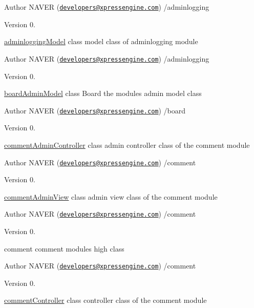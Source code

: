 \begin{DoxyAuthor}{Author}
N\+A\+V\+ER (\href{mailto:developers@xpressengine.com}{\tt developers@xpressengine.\+com}) /adminlogging 
\end{DoxyAuthor}
\begin{DoxyVersion}{Version}
0.
\end{DoxyVersion}
\hyperlink{classadminloggingModel}{adminlogging\+Model} class model class of adminlogging module

\begin{DoxyAuthor}{Author}
N\+A\+V\+ER (\href{mailto:developers@xpressengine.com}{\tt developers@xpressengine.\+com}) /adminlogging 
\end{DoxyAuthor}
\begin{DoxyVersion}{Version}
0.
\end{DoxyVersion}
\hyperlink{classboardAdminModel}{board\+Admin\+Model} class Board the module\textquotesingle{}s admin model class

\begin{DoxyAuthor}{Author}
N\+A\+V\+ER (\href{mailto:developers@xpressengine.com}{\tt developers@xpressengine.\+com}) /board 
\end{DoxyAuthor}
\begin{DoxyVersion}{Version}
0.
\end{DoxyVersion}
\hyperlink{classcommentAdminController}{comment\+Admin\+Controller} class admin controller class of the comment module

\begin{DoxyAuthor}{Author}
N\+A\+V\+ER (\href{mailto:developers@xpressengine.com}{\tt developers@xpressengine.\+com}) /comment 
\end{DoxyAuthor}
\begin{DoxyVersion}{Version}
0.
\end{DoxyVersion}
\hyperlink{classcommentAdminView}{comment\+Admin\+View} class admin view class of the comment module

\begin{DoxyAuthor}{Author}
N\+A\+V\+ER (\href{mailto:developers@xpressengine.com}{\tt developers@xpressengine.\+com}) /comment 
\end{DoxyAuthor}
\begin{DoxyVersion}{Version}
0.
\end{DoxyVersion}
comment comment module\textquotesingle{}s high class

\begin{DoxyAuthor}{Author}
N\+A\+V\+ER (\href{mailto:developers@xpressengine.com}{\tt developers@xpressengine.\+com}) /comment 
\end{DoxyAuthor}
\begin{DoxyVersion}{Version}
0.
\end{DoxyVersion}
\hyperlink{classcommentController}{comment\+Controller} class controller class of the comment module

